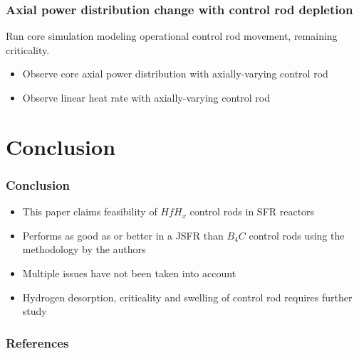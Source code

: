 \documentclass[9pt]{beamer}
\newcommand{\hfh}{$HfH_{x}$\xspace}
\newcommand{\bc}{$B_4C$\xspace}
\begin{document}
\begin{frame}
\frametitle{Axial power distribution change with control rod depletion}
Run core simulation modeling operational control rod movement, remaining criticality.
\begin{itemize}
    \item Observe core axial power distribution with axially-varying control rod
    \item Observe linear heat rate with axially-varying control rod
\end{itemize}
\end{frame}


\section{Conclusion}
\begin{frame}
\frametitle{Conclusion}
\begin{itemize}
    \item This paper claims feasibility of \hfh control rods in \gls{SFR} reactors
    \item Performs as good as or better in a \gls{JSFR} than \bc control rods using the methodology by the authors
    \item Multiple issues have not been taken into account
    \item Hydrogen desorption, criticality and swelling of control rod requires further study
\end{itemize}
\end{frame}

\begin{frame}[allowframebreaks]
  \frametitle{References}
  
  {\footnotesize  }
\end{frame}

\end{document}
